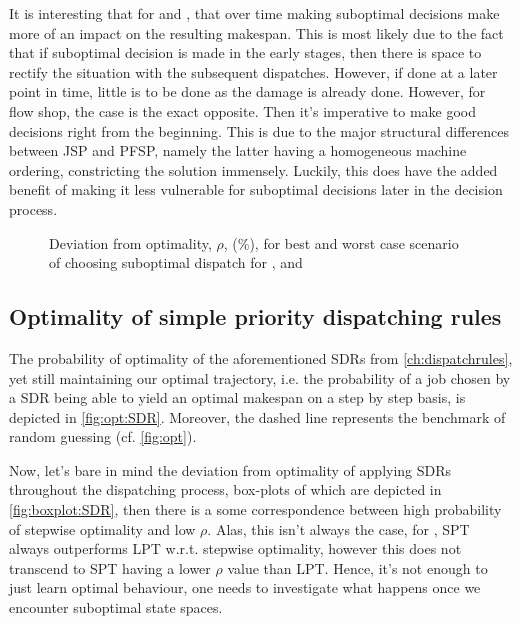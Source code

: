 \documentclass[smallextended]{svjour3}
\begin{document}
It is interesting that for  and , that over time making suboptimal decisions make more of an impact on the resulting makespan. This is most likely due to the fact that if suboptimal decision is made in the early stages, then there is space to rectify the situation with the subsequent dispatches. However, if done at a later point in time, little is to be done as the damage is already done. However, for flow shop, the case is the exact opposite. Then it's imperative to make good decisions right from the beginning. This is due to the major structural differences between JSP and PFSP, namely the latter having a homogeneous machine ordering, constricting the solution immensely. Luckily, this does have the added benefit of making it less vulnerable for suboptimal decisions later in the decision process. 


\begin{figure}
\centering
{}%
\caption{Deviation from optimality, $\rho$, (\%), for best and worst case scenario of choosing suboptimal dispatch for ,  and }
\label{fig:case}
\end{figure}

\subsection{Optimality of simple priority dispatching rules}\label{sec:opt:sdr}
The probability of optimality of the aforementioned SDRs from \cref{ch:dispatchrules}, yet still maintaining our optimal trajectory, i.e. the probability of a job chosen by a SDR being able to yield an optimal makespan on a step by step basis, is depicted  in   \cref{fig:opt:SDR}. Moreover, the dashed line represents the benchmark of random guessing (cf. \cref{fig:opt}).

Now, let's bare in mind the deviation from optimality of applying SDRs throughout the dispatching process, box-plots of which are depicted in \cref{fig:boxplot:SDR}, then there is a some correspondence between high probability of stepwise optimality and low $\rho$. Alas, this isn't always the case, for , SPT always outperforms LPT w.r.t. stepwise optimality, however this does not transcend to SPT having a lower $\rho$ value than LPT. Hence, it's not enough to just learn optimal behaviour, one needs to investigate what happens once we encounter suboptimal state spaces.
\end{document}
